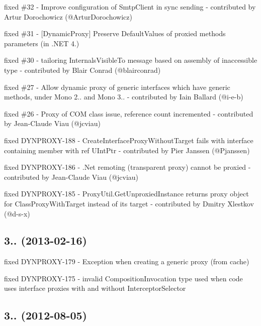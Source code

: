 \begin{DoxyItemize}
\item fixed \#32 -\/ Improve configuration of Smtp\+Client in sync sending -\/ contributed by Artur Dorochowicz (@\+Artur\+Dorochowicz)
\item fixed \#31 -\/ \mbox{[}Dynamic\+Proxy\mbox{]} Preserve Default\+Values of proxied method\textquotesingle{}s parameters (in .N\+ET 4.)
\item fixed \#30 -\/ tailoring Internals\+Visible\+To message based on assembly of inaccessible type -\/ contributed by Blair Conrad (@blairconrad)
\item fixed \#27 -\/ Allow dynamic proxy of generic interfaces which have generic methods, under Mono 2.. and Mono 3.. -\/ contributed by Iain Ballard (@i-\/e-\/b)
\item fixed \#26 -\/ Proxy of C\+OM class issue, reference count incremented -\/ contributed by Jean-\/\+Claude Viau (@jcviau)
\item fixed D\+Y\+N\+P\+R\+O\+X\+Y-\/188 -\/ Create\+Interface\+Proxy\+Without\+Target fails with interface containing member with \textquotesingle{}ref U\+Int\+Ptr\textquotesingle{} -\/ contributed by Pier Janssen (@\+Pjanssen)
\item fixed D\+Y\+N\+P\+R\+O\+X\+Y-\/186 -\/ .Net remoting (transparent proxy) cannot be proxied -\/ contributed by Jean-\/\+Claude Viau (@jcviau)
\item fixed D\+Y\+N\+P\+R\+O\+X\+Y-\/185 -\/ Proxy\+Util.\+Get\+Unproxied\+Instance returns proxy object for Class\+Proxy\+With\+Target instead of its target -\/ contributed by Dmitry Xlestkov (@d-\/s-\/x)
\end{DoxyItemize}

\subsection*{3.. (2013-\/02-\/16)}


\begin{DoxyItemize}
\item fixed D\+Y\+N\+P\+R\+O\+X\+Y-\/179 -\/ Exception when creating a generic proxy (from cache)
\item fixed D\+Y\+N\+P\+R\+O\+X\+Y-\/175 -\/ invalid Composition\+Invocation type used when code uses interface proxies with and without Interceptor\+Selector
\end{DoxyItemize}

\subsection*{3.. (2012-\/08-\/05)}


